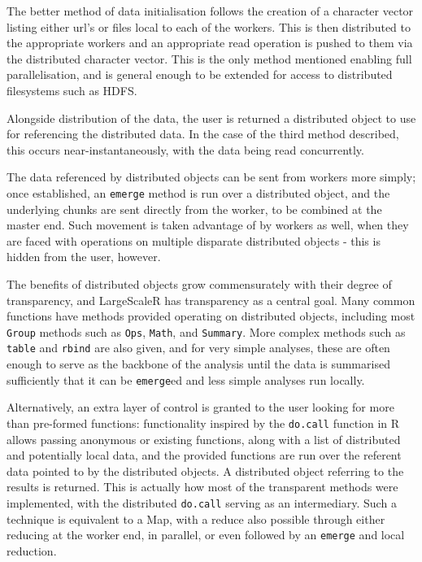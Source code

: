 The better method of data initialisation follows the creation of a character vector listing either url's or files local to each of the workers.
This is then distributed to the appropriate workers and an appropriate read operation is pushed to them via the distributed character vector.
This is the only method mentioned enabling full parallelisation, and is general enough to be extended for access to distributed filesystems such as HDFS.

Alongside distribution of the data, the user is returned a distributed object to use for referencing the distributed data.
In the case of the third method described, this occurs near-instantaneously, with the data being read concurrently.

The data referenced by distributed objects can be sent from workers more simply; once established, an \texttt{emerge} method is run over a distributed object, and the underlying chunks are sent directly from the worker, to be combined at the master end.
Such movement is taken advantage of by workers as well, when they are faced with operations on multiple disparate distributed objects - this is hidden from the user, however.

The benefits of distributed objects grow commensurately with their degree of transparency, and LargeScaleR has transparency as a central goal.
Many common functions have methods provided operating on distributed objects, including most \texttt{Group} methods such as \texttt{Ops}, \texttt{Math}, and \texttt{Summary}.
More complex methods such as \texttt{table} and \texttt{rbind} are also given, and for very simple analyses, these are often enough to serve as the backbone of the analysis until the data is summarised sufficiently that it can be \texttt{emerge}ed and less simple analyses run locally.

Alternatively, an extra layer of control is granted to the user looking for more than pre-formed functions:
functionality inspired by the \texttt{do.call} function in R allows passing anonymous or existing functions, along with a list of distributed and potentially local data, and the provided functions are run over the referent data pointed to by the distributed objects.
A distributed object referring to the results is returned.
This is actually how most of the transparent methods were implemented, with the distributed \texttt{do.call} serving as an intermediary.
Such a technique is equivalent to a Map, with a reduce also possible through either reducing at the worker end, in parallel, or even followed by an \texttt{emerge} and local reduction\cite{mccool2012structured}.

